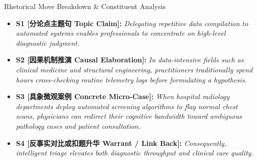 \begin{TipBox}{Rhetorical Move Breakdown \& Constituent Analysis}
\begin{itemize}[leftmargin=1.5em]
  \item \textbf{S1 [分论点主题句 Topic Claim]:} \textit{Delegating repetitive data compilation to automated systems enables professionals to concentrate on high-level diagnostic judgment.}\par{}
  \item \textbf{S2 [因果机制推演 Causal Elaboration]:} \textit{In data-intensive fields such as clinical medicine and structural engineering, practitioners traditionally spend hours cross-checking routine telemetry logs before formulating a hypothesis.}\par{}
  \item \textbf{S3 [具象微观案例 Concrete Micro-Case]:} \textit{When hospital radiology departments deploy automated screening algorithms to flag normal chest scans, physicians can redirect their cognitive bandwidth toward ambiguous pathology cases and patient consultation.}\par{}
  \item \textbf{S4 [反事实对比或扣题升华 Warrant / Link Back]:} \textit{Consequently, intelligent triage elevates both diagnostic throughput and clinical care quality.}\par{}
\end{itemize}
\end{TipBox}
\medskip
